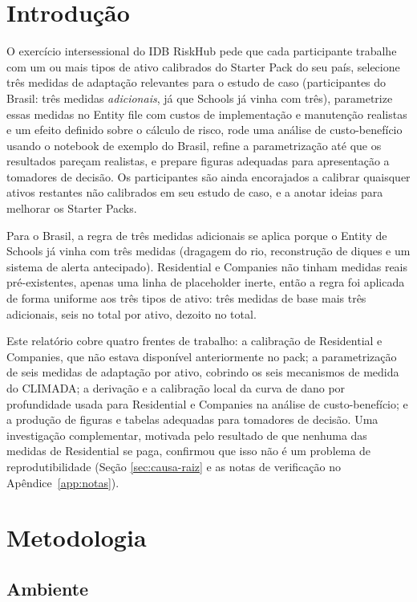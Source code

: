 \documentclass[11pt]{article}
\begin{document}
\section{Introdução}

O exercício intersessional do IDB RiskHub pede que cada participante trabalhe com um ou
mais tipos de ativo calibrados do Starter Pack do seu país, selecione três medidas de
adaptação relevantes para o estudo de caso (participantes do Brasil: três medidas
\emph{adicionais}, já que Schools já vinha com três), parametrize essas medidas no Entity
file com custos de implementação e manutenção realistas e um efeito definido sobre o
cálculo de risco, rode uma análise de custo-benefício usando o notebook de exemplo do
Brasil, refine a parametrização até que os resultados pareçam realistas, e prepare figuras
adequadas para apresentação a tomadores de decisão. Os participantes são ainda encorajados
a calibrar quaisquer ativos restantes não calibrados em seu estudo de caso, e a anotar
ideias para melhorar os Starter Packs.

Para o Brasil, a regra de três medidas adicionais se aplica porque o Entity de Schools já
vinha com três medidas (dragagem do rio, reconstrução de diques e um sistema de alerta
antecipado). Residential e Companies não tinham medidas reais pré-existentes, apenas uma
linha de placeholder inerte, então a regra foi aplicada de forma uniforme aos três tipos de
ativo: três medidas de base mais três adicionais, seis no total por ativo, dezoito no
total.

Este relatório cobre quatro frentes de trabalho: a calibração de Residential e Companies,
que não estava disponível anteriormente no pack; a parametrização de seis medidas de
adaptação por ativo, cobrindo os seis mecanismos de medida do CLIMADA; a derivação e a
calibração local da curva de dano por profundidade usada para Residential e Companies na
análise de custo-benefício; e a produção de figuras e tabelas adequadas para tomadores de
decisão. Uma investigação complementar, motivada pelo resultado de que nenhuma das medidas
de Residential se paga, confirmou que isso não é um problema de reprodutibilidade (Seção
\ref{sec:causa-raiz} e as notas de verificação no Apêndice~\ref{app:notas}).

\section{Metodologia}

\subsection{Ambiente}
\end{document}
